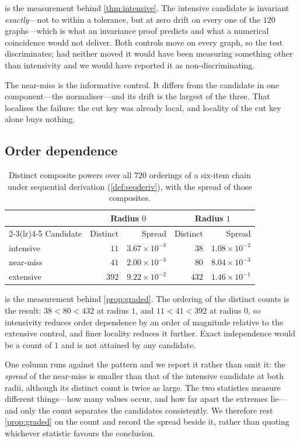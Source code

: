 \documentclass[11pt,twocolumn,a4paper]{article}
\theoremstyle{plain}
\theoremstyle{definition}
\theoremstyle{remark}
\begin{document}
 is the measurement behind \cref{thm:intensive}. The
intensive candidate is invariant \emph{exactly}---not to within a tolerance,
but at zero drift on every one of the $120$ graphs---which is what an
invariance proof predicts and what a numerical coincidence would not deliver.
Both controls move on every graph, so the test discriminates; had neither
moved it would have been measuring something other than intensivity and we
would have reported it as non-discriminating.

The near-miss is the informative control. It differs from the candidate in one
component---the normaliser---and its drift is the largest of the three. That
localises the failure: the cut key was already local, and locality of the cut
key alone buys nothing.

\subsection{Order dependence}

\begin{table}[!htbp]
\centering
\caption{Distinct composite powers over all $720$ orderings of a six-item
chain under sequential derivation (\cref{def:seqderiv}), with the spread of
those composites.}
\label{tab:order}
\begin{tabular}{lrrrr}
\toprule
& \multicolumn{2}{c}{Radius $0$} & \multicolumn{2}{c}{Radius $1$} \\
\cmidrule(lr){2-3}\cmidrule(lr){4-5}
Candidate & Distinct & Spread & Distinct & Spread \\
\midrule
intensive   & $11$  & $3.67\times10^{-3}$ & $38$  & $1.08\times10^{-2}$ \\
near-miss   & $41$  & $2.00\times10^{-3}$ & $80$  & $8.04\times10^{-3}$ \\
extensive   & $392$ & $9.22\times10^{-2}$ & $432$ & $1.46\times10^{-1}$ \\
\bottomrule
\end{tabular}
\end{table}

 is the measurement behind \cref{prop:graded}. The ordering of
the distinct counts is the result: $38<80<432$ at radius $1$, and
$11<41<392$ at radius $0$, so intensivity reduces order dependence by an order
of magnitude relative to the extensive control, and finer locality reduces it
further. Exact independence would be a count of $1$ and is not attained by any
candidate.

One column runs against the pattern and we report it rather than omit it: the
\emph{spread} of the near-miss is smaller than that of the intensive candidate
at both radii, although its distinct count is twice as large. The two
statistics measure different things---how many values occur, and how far apart
the extremes lie---and only the count separates the candidates consistently.
We therefore rest \cref{prop:graded} on the count and record the spread beside
it, rather than quoting whichever statistic favours the conclusion.
\end{document}
